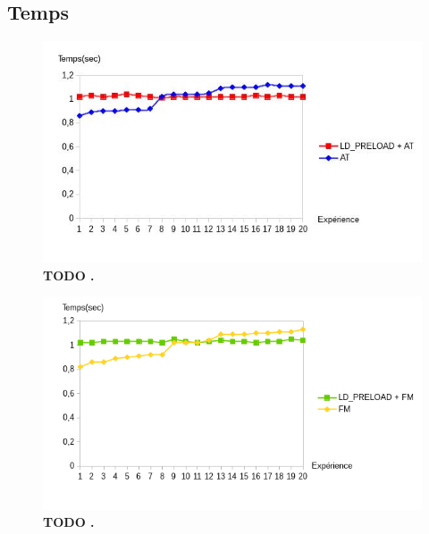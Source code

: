 \subsection{Temps}
\label{section:temps}

\begin{figure}[H]
  \centering
    \includegraphics[scale=0.5]{mesures/graph/Temps_AT.jpg}
    \caption{{\color{red} \textbf{TODO .}}}
    \label{Temps_AT}
\end{figure}

\begin{figure}[H]
  \centering
    \includegraphics[scale=0.5]{mesures/graph/Temps_FM.png}
    \caption{{\color{red} \textbf{TODO .}}}
    \label{Temps_FM}
\end{figure}
